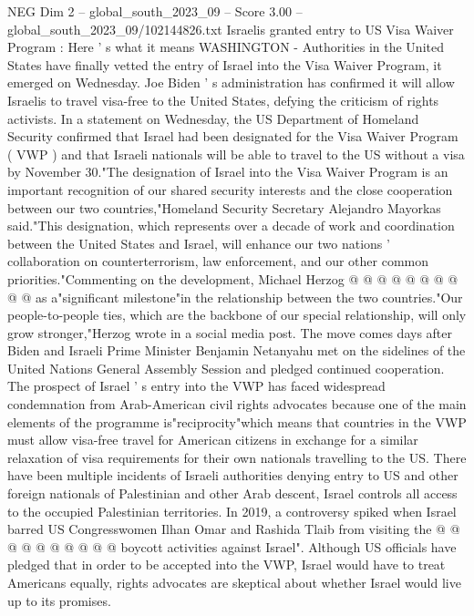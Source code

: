 \begin{textsample}{NEG Dim 2 – global\_south\_2023\_09 – Score 3.00 – global\_south\_2023\_09/102144826.txt}  \label{ex:f2_neg_003}
Israelis granted entry to US Visa Waiver Program : Here ' s what it means WASHINGTON - Authorities in the United States have finally vetted the entry of Israel into the Visa Waiver Program, it emerged on Wednesday.
Joe Biden ' s administration has confirmed it will allow Israelis to travel visa-free to the United States, defying the criticism of rights activists.
In a statement on Wednesday, the US Department of Homeland Security confirmed that Israel had been designated for the Visa Waiver Program ( VWP ) and that Israeli nationals will be able to travel to the US without a visa by November 30."The designation of Israel into the Visa Waiver Program is an important recognition of our shared security interests and the close cooperation between our two countries,"Homeland Security Secretary Alejandro Mayorkas said."This designation, which represents over a decade of work and coordination between the United States and Israel, will enhance our two nations ' collaboration on counterterrorism, law enforcement, and our other common priorities."Commenting on the development, Michael Herzog @ @ @ @ @ @ @ @ @ @ as a"significant milestone"in the relationship between the two countries."Our people-to-people ties, which are the backbone of our special relationship, will only grow stronger,"Herzog wrote in a social media post.
The move comes days after Biden and Israeli Prime Minister Benjamin Netanyahu met on the sidelines of the United Nations General Assembly Session and pledged continued cooperation.
The prospect of Israel ' s entry into the VWP has faced widespread condemnation from Arab-American civil rights advocates because one of the main elements of the programme is"reciprocity"which means that countries in the VWP must allow visa-free travel for American citizens in exchange for a similar relaxation of visa requirements for their own nationals travelling to the US.
There have been multiple incidents of Israeli authorities denying entry to US and other foreign nationals of Palestinian and other Arab descent, Israel controls all access to the occupied Palestinian territories.
In 2019, a controversy spiked when Israel barred US Congresswomen Ilhan Omar and Rashida Tlaib from visiting the @ @ @ @ @ @ @ @ @ @ boycott activities against Israel".
Although US officials have pledged that in order to be accepted into the VWP, Israel would have to treat Americans equally, rights advocates are skeptical about whether Israel would live up to its promises.

\end{textsample}
